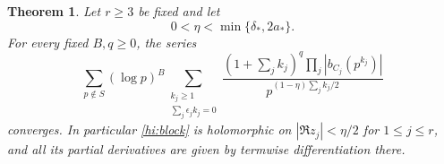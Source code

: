 \documentclass[11pt,reqno]{amsart}
\numberwithin{equation}{section}
\newtheorem{theorem}{Theorem}[section]
\theoremstyle{definition}
\theoremstyle{remark}
\begin{document}
\begin{theorem}\label{hi:convergence}
Let $r\geq3$ be fixed and let
\begin{equation}\label{hi:eta-range}
 0<\eta<\min\{\delta_*,2a_*\}.
\end{equation}
For every fixed $B,q\geq0$, the series
\begin{equation}\label{hi:absolute-margin}
 \sum_{p\notin S}(\log p)^B
 \sum_{\substack{k_j\geq1\\\sum_j\epsilon_jk_j=0}}
 \frac{(1+\sum_jk_j)^q\prod_j|b_{C_j}(p^{k_j})|}
 {p^{(1-\eta)\sum_jk_j/2}}
\end{equation}
converges.  In particular \eqref{hi:block} is holomorphic on
$|\Re z_j|<\eta/2$ for $1\leq j\leq r$, and all its partial derivatives
are given by termwise differentiation there.
\end{theorem}
\end{document}
